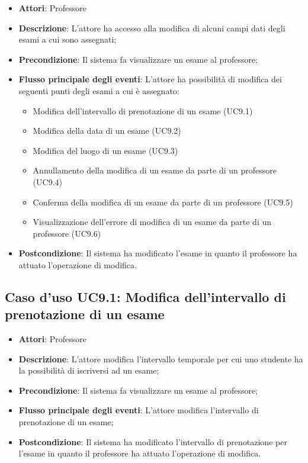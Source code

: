 \begin{itemize}
\item \textbf{Attori}: Professore
\item \textbf{Descrizione}: L'attore ha accesso alla modifica di alcuni campi dati degli esami a cui sono assegnati;
\item \textbf{Precondizione}: Il sistema fa visualizzare un esame al professore;

\item \textbf{Flusso principale degli eventi}: L'attore ha possibilità di modifica dei seguenti punti degli esami a cui è assegnato:
\begin{itemize}
\item Modifica dell'intervallo di prenotazione di un esame (UC9.1)
\item Modifica della data di un esame (UC9.2)
\item Modifica del luogo di un esame (UC9.3)
\item Annullamento della modifica di un esame da parte di un professore (UC9.4)
\item Conferma della modifica di un esame da parte di un professore (UC9.5)
\item Visualizzazione dell'errore di modifica di un esame da parte di un professore (UC9.6)
\end{itemize}
\item \textbf{Postcondizione}: Il sistema ha modificato l'esame in quanto il professore ha attuato l'operazione di modifica.

\end{itemize}
\subsection{Caso d'uso \texorpdfstring{UC9.1}{UC9.1}: Modifica dell'intervallo di prenotazione di un esame}
\begin{itemize}
\item \textbf{Attori}: Professore
\item \textbf{Descrizione}: L'attore modifica l'intervallo temporale per cui uno studente ha la possibilità di iscriversi ad un esame;
\item \textbf{Precondizione}: Il sistema fa visualizzare un esame al professore;


\item \textbf{Flusso principale degli eventi}: L'attore modifica l'intervallo di prenotazione di un esame;
\item \textbf{Postcondizione}: Il sistema ha modificato l'intervallo di prenotazione per l’esame in quanto il professore ha attuato l'operazione di modifica.

\end{itemize}
